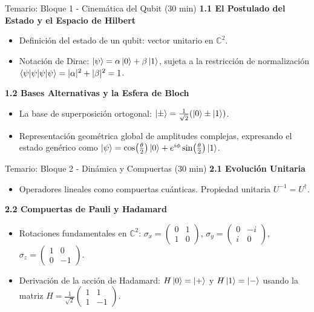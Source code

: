 \documentclass[aspectratio=169]{beamer}
\begin{document}
\begin{frame}{Temario: Bloque 1 - Cinemática del Qubit (30 min)}
\textbf{1.1 El Postulado del Estado y el Espacio de Hilbert}
\begin{itemize}
    \item Definición del estado de un qubit: vector unitario en $\mathbb{C}^2$.
    \item Notación de Dirac: $\ket{\psi} = \alpha\ket{0} + \beta\ket{1}$, sujeta a la restricción de normalización $\braket{\psi|\psi} = |\alpha|^2 + |\beta|^2 = 1$.
\end{itemize}
\textbf{1.2 Bases Alternativas y la Esfera de Bloch}
\begin{itemize}
    \item La base de superposición ortogonal: $\ket{\pm} = \frac{1}{\sqrt{2}}(\ket{0} \pm \ket{1})$.
    \item Representación geométrica global de amplitudes complejas, expresando el estado genérico como $\ket{\psi} = \cos(\frac{\theta}{2})\ket{0} + e^{i\phi}\sin(\frac{\theta}{2})\ket{1}$.
\end{itemize}
\end{frame}

\begin{frame}{Temario: Bloque 2 - Dinámica y Compuertas (30 min)}
\textbf{2.1 Evolución Unitaria}
\begin{itemize}
    \item Operadores lineales como compuertas cuánticas. Propiedad unitaria $U^{-1} = U^\dagger$.
\end{itemize}
\textbf{2.2 Compuertas de Pauli y Hadamard}
\begin{itemize}
    \item Rotaciones fundamentales en $\mathbb{C}^2$: 
    $\sigma_x = \begin{pmatrix} 0 & 1 \\ 1 & 0 \end{pmatrix}$, $\sigma_y = \begin{pmatrix} 0 & -i \\ i & 0 \end{pmatrix}$, $\sigma_z = \begin{pmatrix} 1 & 0 \\ 0 & -1 \end{pmatrix}$.
    \item Derivación de la acción de Hadamard: $H\ket{0} = \ket{+}$ y $H\ket{1} = \ket{-}$ usando la matriz $H = \frac{1}{\sqrt{2}}\begin{pmatrix} 1 & 1 \\ 1 & -1 \end{pmatrix}$.
\end{itemize}
\end{frame}
\end{document}
